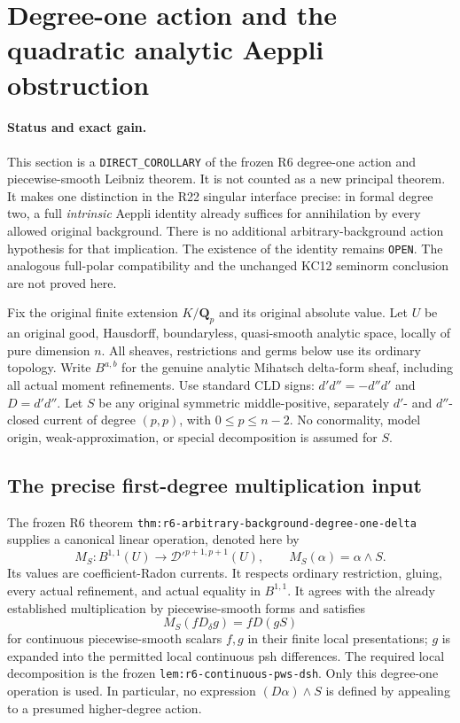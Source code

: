 \section{Degree-one action and the quadratic analytic Aeppli obstruction}
\label{sec:r23-quadratic-aeppli-action}

\paragraph{Status and exact gain.}
This section is a \texttt{DIRECT\_COROLLARY} of the frozen R6
degree-one action and piecewise-smooth Leibniz theorem.  It is not
counted as a new principal theorem.  It makes one distinction in
the R22 singular interface precise: in formal degree two, a full
\emph{intrinsic} Aeppli identity already suffices for annihilation
by every allowed original background.  There is no additional
arbitrary-background action hypothesis for that implication.
The existence of the identity remains \texttt{OPEN}.  The analogous
full-polar compatibility and the unchanged KC12 seminorm conclusion
are not proved here.

Fix the original finite extension $K/\mathbf Q_p$ and its original
absolute value.  Let $U$ be an original good, Hausdorff, boundaryless,
quasi-smooth analytic space, locally of pure dimension $n$.  All
sheaves, restrictions and germs below use its ordinary topology.
Write $B^{a,b}$ for the genuine analytic Mihatsch delta-form sheaf,
including all actual moment refinements.  Use standard CLD signs:
$d'd''=-d''d'$ and $D=d'd''$.  Let $S$ be any original symmetric
middle-positive, separately $d'$- and $d''$-closed current of degree
$(p,p)$, with $0\le p\le n-2$.  No conormality, model origin,
weak-approximation, or special decomposition is assumed for $S$.

\subsection{The precise first-degree multiplication input}

The frozen R6 theorem
\texttt{thm:r6-arbitrary-background-degree-one-delta} supplies a
canonical linear operation, denoted here by
\[
 M_S:B^{1,1}(U)\longrightarrow\mathcal D'^{p+1,p+1}(U),
 \qquad M_S(\alpha)=\alpha\wedge S.                 \tag{QA1}
\]
Its values are coefficient-Radon currents.  It respects ordinary
restriction, gluing, every actual refinement, and actual equality
in $B^{1,1}$.  It agrees with the already established multiplication
by piecewise-smooth forms and satisfies
\[
       M_S(fD_\delta g)=fD(gS)                       \tag{QA2}
\]
for continuous piecewise-smooth scalars $f,g$ in their finite local
presentations; $g$ is expanded into the permitted local continuous
psh differences.  The required local decomposition is the frozen
\texttt{lem:r6-continuous-pws-dsh}.  Only this degree-one operation
is used.  In particular, no expression $(D\alpha)\wedge S$ is
defined by appealing to a presumed higher-degree action.

